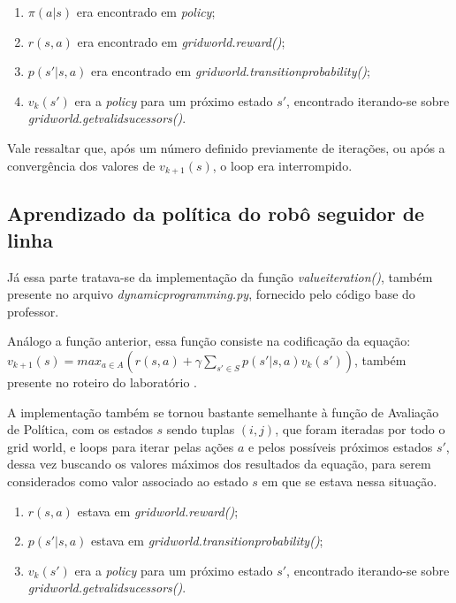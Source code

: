 \documentclass[conference]{IEEEtran}
\begin{document}
\begin{enumerate}
\item $\pi \left ( a|s \right )$ era encontrado em \textit{policy};

\item $r \left ( s, a \right )$ era encontrado em \textit{grid\underline{\space}world.reward()};

\item $p \left ( s' | s, a \right )$ era encontrado em \textit{grid\underline{\space}world.transition\underline{\space}probability()};

\item $v_k \left ( s' \right )$ era a \textit{policy} para um próximo estado $s'$, encontrado iterando-se sobre \textit{grid\underline{\space}world.get\underline{\space}valid\underline{\space}sucessors()}.
\end{enumerate}

Vale ressaltar que, após um número definido previamente de iterações, ou após a convergência dos valores de $v_{k+1}(s)$, o loop era interrompido.

\subsection{Aprendizado da política do robô seguidor de linha}
Já essa parte tratava-se da implementação da função \textit{value\underline{\space}iteration()}, também presente no arquivo \textit{dynamic\underline{\space}programming.py}, fornecido pelo código base do professor.

Análogo a função anterior, essa função consiste na codificação da equação: $v_{k+1}\left ( s \right ) = max_{a \in A} \left (  r \left ( s, a \right ) + \gamma \sum_{s'\in S} p \left ( s' | s, a \right ) v_k \left ( s' \right ) \right )$, também presente no roteiro do laboratório \cite{roteiro}.

A implementação também se tornou bastante semelhante à função de Avaliação de Política, com os estados $s$ sendo tuplas $(i, j)$, que foram iteradas por todo o grid world, e loops para iterar pelas ações $a$ e pelos possíveis próximos estados $s'$, dessa vez buscando os valores máximos dos resultados da equação, para serem considerados como valor associado ao estado $s$ em que se estava nessa situação. 

\begin{enumerate}
\item $r \left ( s, a \right )$ estava em \textit{grid\underline{\space}world.reward()};

\item $p \left ( s' | s, a \right )$ estava em \textit{grid\underline{\space}world.transition\underline{\space}probability()};

\item $v_k \left ( s' \right )$ era a \textit{policy} para um próximo estado $s'$, encontrado iterando-se sobre \textit{grid\underline{\space}world.get\underline{\space}valid\underline{\space}sucessors()}.
\end{enumerate}
\end{document}
